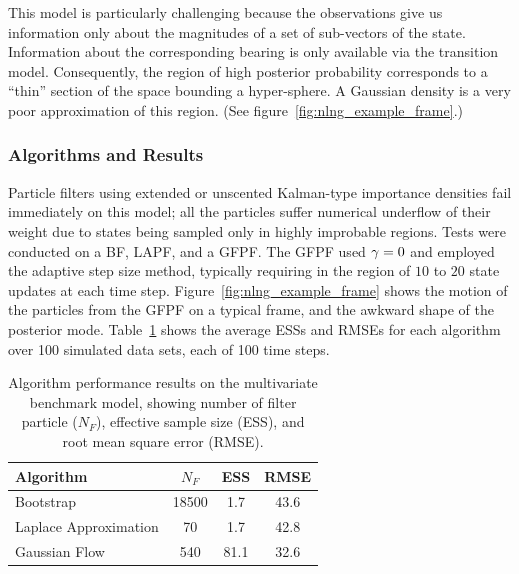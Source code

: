 \documentclass{article}
\begin{document}
This model is particularly challenging because the observations give us information only about the magnitudes of a set of sub-vectors of the state. Information about the corresponding bearing is only available via the transition model. Consequently, the region of high posterior probability corresponds to a ``thin'' section of the space bounding a hyper-sphere. A Gaussian density is a very poor approximation of this region. (See figure~\ref{fig:nlng_example_frame}.)

\subsubsection{Algorithms and Results}

Particle filters using extended or unscented Kalman-type importance densities fail immediately on this model; all the particles suffer numerical underflow of their weight due to states being sampled only in highly improbable regions. Tests were conducted on a BF, LAPF, and a GFPF. The GFPF used $\gamma=0$ and employed the adaptive step size method, typically requiring in the region of $10$ to $20$ state updates at each time step. Figure~\ref{fig:nlng_example_frame} shows the motion of the particles from the GFPF on a typical frame, and the awkward shape of the posterior mode. Table~\ref{tab:nlng_results} shows the average ESSs and RMSEs for each algorithm over 100 simulated data sets, each of 100 time steps.
%
\begin{table}
\centering
\begin{tabular}{l||c|c|c}
Algorithm                                & $N_F$ & ESS  & RMSE \\
\hline
Bootstrap                                & 18500 &  1.7 & 43.6 \\
Laplace Approximation                    &    70 &  1.7 & 42.8 \\
Gaussian Flow                            &   540 & 81.1 & 32.6 \\
\end{tabular}
\caption{Algorithm performance results on the multivariate benchmark model, showing number of filter particle ($N_F$), effective sample size (ESS), and root mean square error (RMSE).}
\label{tab:nlng_results}
\end{table}
%
\end{document}
